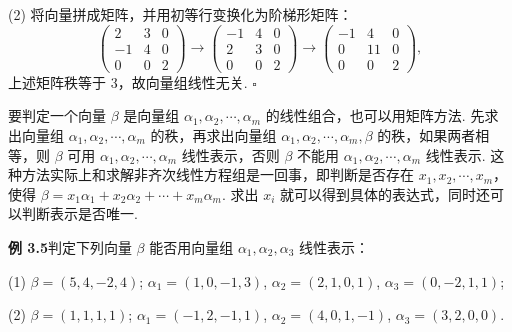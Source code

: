 \documentclass[UTF8, 12pt, fontset=fandol, oneside]{ctexart}
\begin{document}
(2) 将向量拼成矩阵，并用初等行变换化为阶梯形矩阵：
\[
\begin{pmatrix}
2 & 3 & 0\\
-1 & 4 & 0\\
0 & 0 & 2
\end{pmatrix}
\to
\begin{pmatrix}
-1 & 4 & 0\\
2 & 3 & 0\\
0 & 0 & 2
\end{pmatrix}
\to
\begin{pmatrix}
-1 & 4 & 0\\
0 & 11 & 0\\
0 & 0 & 2
\end{pmatrix},
\]
上述矩阵秩等于 3，故向量组线性无关. $\square$

要判定一个向量 $\beta$ 是向量组 $\alpha_1,\alpha_2,\cdots,\alpha_m$ 的线性组合，也可以用矩阵方法. 先求出向量组 $\alpha_1,\alpha_2,\cdots,\alpha_m$ 的秩，再求出向量组 $\alpha_1,\alpha_2,\cdots,\alpha_m,\beta$ 的秩，如果两者相等，则 $\beta$ 可用 $\alpha_1,\alpha_2,\cdots,\alpha_m$ 线性表示，否则 $\beta$ 不能用 $\alpha_1,\alpha_2,\cdots,\alpha_m$ 线性表示. 这种方法实际上和求解非齐次线性方程组是一回事，即判断是否存在 $x_1,x_2,\cdots,x_m$，使得 $\beta=x_1\alpha_1+x_2\alpha_2+\cdots+x_m\alpha_m$. 求出 $x_i$ 就可以得到具体的表达式，同时还可以判断表示是否唯一.

\noindent\textbf{例 3.5}\quad 判定下列向量 $\beta$ 能否用向量组 $\alpha_1,\alpha_2,\alpha_3$ 线性表示：

(1) $\beta=(5,4,-2,4)$; $\alpha_1=(1,0,-1,3)$, $\alpha_2=(2,1,0,1)$, $\alpha_3=(0,-2,1,1)$;

(2) $\beta=(1,1,1,1)$; $\alpha_1=(-1,2,-1,1)$, $\alpha_2=(4,0,1,-1)$, $\alpha_3=(3,2,0,0)$.
\end{document}
